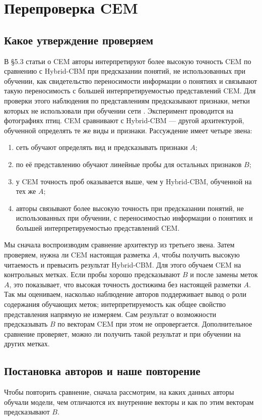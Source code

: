 \documentclass[10pt]{article}
\begin{document}
\section{Перепроверка CEM}\label{sec:cem}
\subsection{Какое утверждение проверяем}
В §5.3 статьи о CEM авторы интерпретируют более высокую точность CEM по сравнению с Hybrid-CBM при предсказании понятий, не использованных при обучении, как свидетельство переносимости информации о понятиях и связывают такую переносимость с большей интерпретируемостью представлений CEM. Для проверки этого наблюдения по представлениям предсказывают признаки, метки которых не использовали при обучении сети \citep[§5.3, приложение~A.9]{cem}. Эксперимент проводится на фотографиях птиц. CEM сравнивают с Hybrid-CBM --- другой архитектурой, обученной определять те же виды и признаки. Рассуждение имеет четыре звена:
\begin{enumerate}
\item сеть обучают определять вид и предсказывать признаки $A$;
\item по её представлению обучают линейные пробы для остальных признаков $B$;
\item у CEM точность проб оказывается выше, чем у Hybrid-CBM, обученной на тех же $A$;
\item авторы связывают более высокую точность при предсказании понятий, не использованных при обучении, с переносимостью информации о понятиях и большей интерпретируемостью представлений CEM.
\end{enumerate}
Мы сначала воспроизводим сравнение архитектур из третьего звена. Затем проверяем, нужна ли CEM настоящая разметка $A$, чтобы получить высокую читаемость и превысить результат Hybrid-CBM. Для этого обучаем CEM на контрольных метках. Если пробы хорошо предсказывают $B$ и после замены меток $A$, это показывает, что высокая точность достижима без настоящей разметки $A$. Так мы оцениваем, насколько наблюдение авторов поддерживает вывод о роли содержания обучающих меток; интерпретируемость как общее свойство представления напрямую не измеряем. Сам результат о возможности предсказывать $B$ по векторам CEM при этом не опровергается. Дополнительное сравнение проверяет, можно ли получить такой результат и при обучении на других метках.

\subsection{Постановка авторов и наше повторение}
Чтобы повторить сравнение, сначала рассмотрим, на каких данных авторы обучали модели, чем отличаются их внутренние векторы и как по этим векторам предсказывают $B$.
\end{document}
